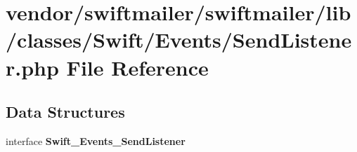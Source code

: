 \section{vendor/swiftmailer/swiftmailer/lib/classes/\+Swift/\+Events/\+Send\+Listener.php File Reference}
\label{_send_listener_8php}
\subsection*{Data Structures}
\begin{DoxyCompactItemize}
\item 
interface {\bf Swift\+\_\+\+Events\+\_\+\+Send\+Listener}
\end{DoxyCompactItemize}
